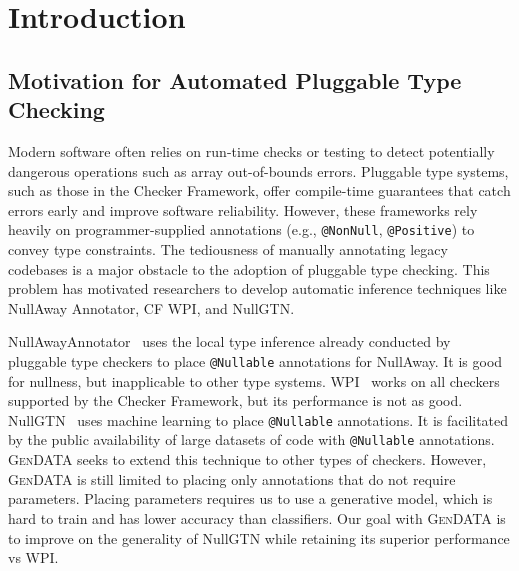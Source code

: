 \documentclass[acmsmall,screen,review,anonymous]{acmart}
\makeatletter
\newcommand{\gendata}{\textsc{GenDATA}\xspace}
\newcommand{\cf}{Checker Framework\xspace}
\newcommand{\atmark}[1]{\texttt{@#1}}
\makeatother
\begin{document}


\maketitle

\section{Introduction}
\label{sec:introduction}

\subsection{Motivation for Automated Pluggable Type Checking}
\label{sec:motivation}

Modern software often relies on run-time checks or testing to detect potentially dangerous operations such as array out-of-bounds errors. Pluggable type systems, such as those in the \cf, offer compile-time guarantees that catch errors early and improve software reliability. However, these frameworks rely heavily on programmer-supplied annotations (e.g., \atmark{NonNull}, \atmark{Positive}) to convey type constraints. The tediousness of manually annotating legacy codebases is a major obstacle to the adoption of pluggable type checking. This problem has motivated researchers to develop automatic inference techniques like NullAway Annotator, CF WPI, and NullGTN.

NullAwayAnnotator~\cite{karimipour2023practical} uses the local type inference already conducted by pluggable type checkers to place \atmark{Nullable} annotations for NullAway. It is good for nullness, but inapplicable to other type systems. WPI~\cite{kellogg2023pluggable} works on all checkers supported by the \cf, but its performance is not as good. NullGTN~\cite{siddiqui2024inferring} uses machine learning to place \atmark{Nullable} annotations. It is facilitated by the public availability of large datasets of code with \atmark{Nullable} annotations. \gendata seeks to extend this technique to other types of checkers. However, \gendata is still limited to placing only annotations that do not require parameters. Placing parameters requires us to use a generative model, which is hard to train and has lower accuracy than classifiers. Our goal with \gendata is to improve on the generality of NullGTN while retaining its superior performance vs WPI.
\end{document}
